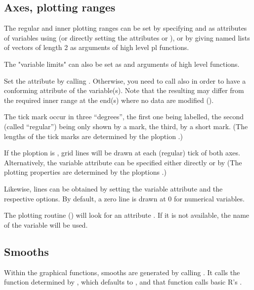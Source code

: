 \documentclass[11pt]{article}
\begin{document}
\subsection{Axes, plotting ranges}

The regular and inner plotting ranges can be set by specifying
 and  as attributes of variables using 
 (or directly setting the attributes 
 or ),
or by giving named lists of vectors of length 2
as arguments of high level pl functions.

The "variable limits"  can also be set as
 and  arguments of high level functions.

Set the  attribute by calling . 
Otherwise, you need to call also  in order to have a conforming
 attribute of the variable(s).
Note that the resulting  may differ from the required 
inner range at the end(s) where no data are modified ().


The tick mark occur in three ``degrees'', the first one being labelled,
the second (called ``regular'') being only shown by a mark, the third, 
by a short mark.
(The lengths of the tick marks are determined by the ploption .)

If the ploption  is , grid lines will be drawn at each (regular)
tick of both axes. 
Alternatively, the variable attribute  can be specified either 
directly or by 
(The plotting properties  are determined by the ploptions
.)

Likewise, lines can be obtained by setting the variable attribute 
and the respective options. By default, a zero line is drawn at 0 for
numerical variables.

The plotting routine () will look for an attribute .
If it is not available, the name of the variable will be used.

\subsection{Smooths}

Within the graphical functions, smooths are generated by calling 
. It calls the function determined by
, which defaults to , and that
function calls basic R's .
\end{document}
